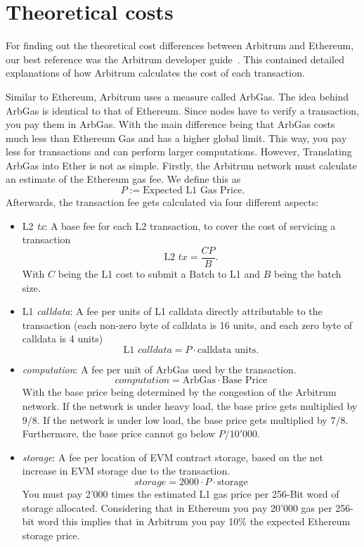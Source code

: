 \documentclass[a4paper,oneside,openright,11pt]{report}
\begin{document}
\section{Theoretical costs}
For finding out the theoretical cost differences between Arbitrum and Ethereum, 
our best reference was the Arbitrum developer guide~\cite{ArbDevGuide}. 
This contained detailed explanations of how Arbitrum calculates the cost of 
each transaction.

Similar to Ethereum, Arbitrum uses a measure called ArbGas. The idea behind ArbGas is 
identical to that of Ethereum. Since nodes have to verify a transaction, you pay them
in ArbGas. With the main difference being that ArbGas costs much less than Ethereum Gas 
and has a higher global limit. This way, you pay less for transactions and can perform larger
computations. However, Translating ArbGas into Ether is not as simple. 
Firstly, the Arbitrum network must calculate an estimate of the Ethereum gas fee.
We define this as
\[
	P := \text{Expected L1 Gas Price}.
\]
Afterwards, the transaction fee gets calculated via four different aspects:
\begin{itemize}
  \item L2 \textit{tx}: A base fee for each L2 transaction, to cover the cost of servicing a transaction
  \[
		\text{L2 } \textit{tx} = \frac{CP}{B}.
	\] 
	With $C$ being the L1 cost to submit a Batch to L1 and $B$ being the batch size.
	
  \item L1 \textit{calldata}: A fee per units of L1 calldata directly attributable to the transaction 
  (each non-zero byte of calldata is 16 units, and each zero byte of calldata is 4 units)
  \[
		\text{L1 } \textit{calldata} = P \cdot \text{calldata units}.
	\]
	
  \item \textit{computation}: A fee per unit of ArbGas used by the transaction.
  \[
		\textit{computation} = \text{ArbGas} \cdot \text{Base Price}
	\]
  With the base price being determined by the congestion of the Arbitrum network. 
  If the network is under heavy load, the base price gets multiplied by $9/8$. 
  If the network is under low load, the base price gets multiplied by $7/8$.
  Furthermore, the base price cannot go below $P/10'000$.
  
  \item \textit{storage}: A fee per location of EVM contract storage, based on the net increase in EVM storage due to the transaction.
  \[
		\textit{storage} = 2000 \cdot P \cdot \text{storage}
	\]
	You must pay 2'000 times the estimated L1 gas price per 256-Bit word of storage allocated. 
	Considering that in Ethereum you pay 20'000 gas per 256-bit word this implies that in Arbitrum
	you pay 10\% the expected Ethereum storage price.
\end{itemize}
\end{document}
